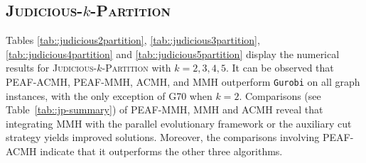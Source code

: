 \documentclass[12pt, a4paper]{article}%
\numberwithin{equation}{section}
\theoremstyle{plain}
\begin{document}
			
			
			
			
			
			
			\subsection{\textsc{Judicious}-$k$-\textsc{Partition}}
			\label{sec::result-jp}
			
			Tables \ref{tab::judicious2partition}, \ref{tab::judicious3partition}, \ref{tab::judicious4partition} and \ref{tab::judicious5partition} display the numerical results for \textsc{Judicious}-$k$-\textsc{Partition} with $k=2,3,4,5$. {It can be observed that PEAF-ACMH, PEAF-MMH, ACMH, and MMH outperform
\texttt{Gurobi} on all graph instances, with the only exception of G70 when
$k=2$.}
            Comparisons (see Table~\ref{tab::jp-summary}) of PEAF-MMH, MMH and ACMH reveal that integrating MMH with the parallel evolutionary framework or the auxiliary cut strategy yields improved solutions. Moreover, the comparisons involving PEAF-ACMH indicate that it outperforms the other three algorithms.
			
			
			
\end{document}
